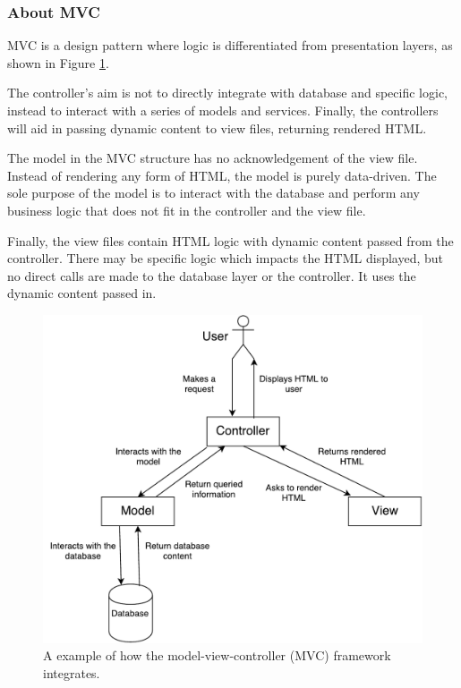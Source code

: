 \subsubsection{About MVC}
MVC is a design pattern where logic is differentiated from presentation layers, as shown in Figure \ref{fig:mvc}.

The controller's aim is not to directly integrate with database and specific logic, instead to interact with a series of models and services. Finally, the controllers will aid in passing dynamic content to view files, returning rendered HTML.

The model in the MVC structure has no acknowledgement of the view file. Instead of rendering any form of HTML, the model is purely data-driven. The sole purpose of the model is to interact with the database and perform any business logic that does not fit in the controller and the view file.

Finally, the view files contain HTML logic with dynamic content passed from the controller. There may be specific logic which impacts the HTML displayed, but no direct calls are made to the database layer or the controller. It uses the dynamic content passed in.

\begin{figure}[H]
  \centering
  \includegraphics[scale=0.38]{images/MVC.pdf}
  \caption{A example of how the model-view-controller (MVC) framework integrates.}
  \label{fig:mvc}
\end{figure}

